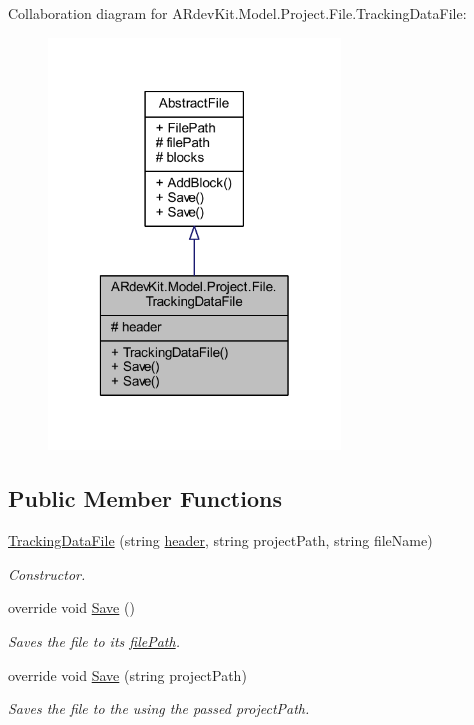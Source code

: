 Collaboration diagram for A\-Rdev\-Kit.\-Model.\-Project.\-File.\-Tracking\-Data\-File\-:
\nopagebreak
\begin{figure}[H]
\begin{center}
\leavevmode
\includegraphics[width=220pt]{class_a_rdev_kit_1_1_model_1_1_project_1_1_file_1_1_tracking_data_file__coll__graph}
\end{center}
\end{figure}
\subsection*{Public Member Functions}
\begin{DoxyCompactItemize}
\item 
\hyperlink{class_a_rdev_kit_1_1_model_1_1_project_1_1_file_1_1_tracking_data_file_a6214400ae9e07924ead5ca1779562bd8}{Tracking\-Data\-File} (string \hyperlink{class_a_rdev_kit_1_1_model_1_1_project_1_1_file_1_1_tracking_data_file_a77dd60e8f9b895d679a15490f5cbb605}{header}, string project\-Path, string file\-Name)
\begin{DoxyCompactList}\small\item\em Constructor. \end{DoxyCompactList}\item 
override void \hyperlink{class_a_rdev_kit_1_1_model_1_1_project_1_1_file_1_1_tracking_data_file_a101d61e5cb5e45922adb70178838c5be}{Save} ()
\begin{DoxyCompactList}\small\item\em Saves the file to its \hyperlink{class_a_rdev_kit_1_1_model_1_1_project_1_1_file_1_1_abstract_file_ad879e3a81860da8b72f2d9f61a18ab3b}{file\-Path}. \end{DoxyCompactList}\item 
override void \hyperlink{class_a_rdev_kit_1_1_model_1_1_project_1_1_file_1_1_tracking_data_file_a6b96d140f6a8e9c98888afece89b41f5}{Save} (string project\-Path)
\begin{DoxyCompactList}\small\item\em Saves the file to the using the passed project\-Path. \end{DoxyCompactList}\end{DoxyCompactItemize}
